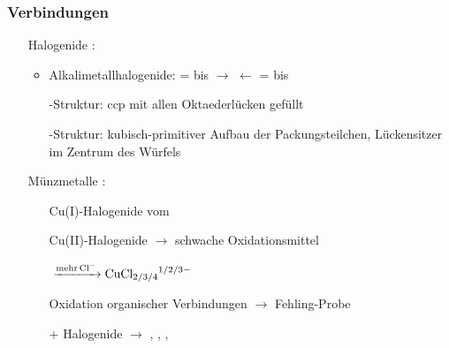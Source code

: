 \documentclass[a4paper, 12pt]{article}
\begin{document}
\subsubsection{Verbindungen}
\begin{itemize}
    \item[Halogenide]:
    \begin{itemize}
        \item Alkalimetallhalogenide:  =  bis  $\rightarrow$  $\leftarrow$  =  bis 
        \item[] -Struktur: ccp mit allen Oktaederlücken gefüllt
        \item[] -Struktur: kubisch-primitiver Aufbau der Packungsteilchen, Lückensitzer im Zentrum des Würfels 
    \end{itemize}
    \item[Münzmetalle]:
    \begin{itemize}
        \item[] Cu(I)-Halogenide vom 
        \item[] Cu(II)-Halogenide $\rightarrow$ schwache Oxidationsmittel
        \item[]  $\ce{->[\mathrm{mehr} \ce{Cl^-}] CuCl_{2/3/4}^{1/2/3 -}}$
        \item[] 
        \item[] 
        \item[] 
        \item[] Oxidation organischer Verbindungen $\rightarrow$ Fehling-Probe
        \item[]  + Halogenide $\rightarrow$ , , ,  
    \end{itemize}
\end{itemize}
\end{document}
